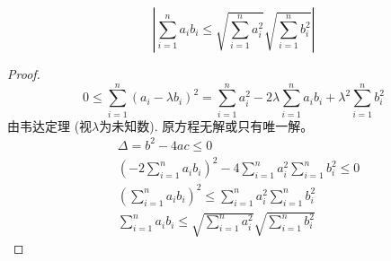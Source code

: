 \begin{equation*}
	|\sum_{i=1}^n a_i b_i \le \sqrt{\sum_{i=1}^n a_i^2}\sqrt{\sum_{i=1}^n b_i^2}|
\end{equation*}

\begin{proof}
	\begin{equation*}
		 0 \le \sum_{i=1}^n (a_i - \lambda b_i)^2  = \sum_{i=1}^n a_i^2 - 2 \lambda \sum_{i=1}^n a_i b_i  + \lambda^2 \sum_{i=1}^n b_i^2
	\end{equation*}
	由韦达定理 (视$ \lambda $为未知数). 原方程无解或只有唯一解。
	\begin{align*}
		&\Delta = b^2-4ac \le 0\\
		&(-2\sum_{i=1}^n a_i b_i)^2 - 4\sum_{i=1}^n a_i^2 \sum_{i=1}^n b_i^2 \le 0 \\
		&(\sum_{i=1}^n a_i b_i)^2 \le \sum_{i=1}^n a_i^2 \sum_{i=1}^n b_i^2 \\
		&\sum_{i=1}^n a_i b_i \le \sqrt{\sum_{i=1}^n a_i^2} \sqrt{\sum_{i=1}^n b_i^2} 
	\end{align*}
\end{proof}

